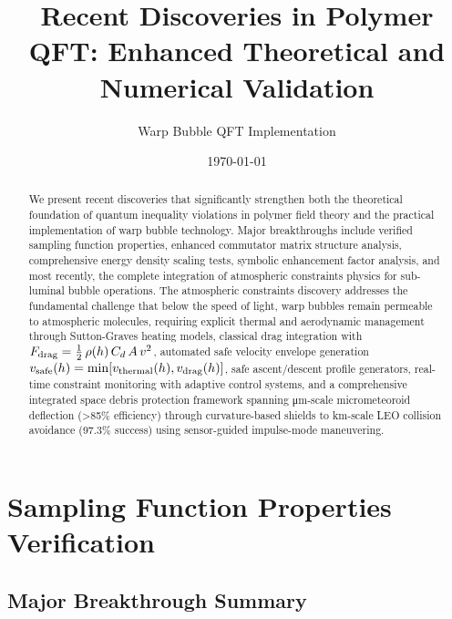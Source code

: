 \documentclass[11pt]{article}
\title{Recent Discoveries in Polymer QFT: Enhanced Theoretical and Numerical Validation}
\author{Warp Bubble QFT Implementation}
\date{\today}
\begin{document}
\maketitle

\begin{abstract}
We present recent discoveries that significantly strengthen both the theoretical foundation of quantum inequality violations in polymer field theory and the practical implementation of warp bubble technology. Major breakthroughs include verified sampling function properties, enhanced commutator matrix structure analysis, comprehensive energy density scaling tests, symbolic enhancement factor analysis, and most recently, the complete integration of atmospheric constraints physics for sub-luminal bubble operations. The atmospheric constraints discovery addresses the fundamental challenge that below the speed of light, warp bubbles remain permeable to atmospheric molecules, requiring explicit thermal and aerodynamic management through Sutton-Graves heating models, classical drag integration with $F_{\rm drag}=\tfrac12\,\rho(h)\,C_d\,A\,v^2$, automated safe velocity envelope generation $v_{\rm safe}(h)=\min[v_{\rm thermal}(h),v_{\rm drag}(h)]$, safe ascent/descent profile generators, real-time constraint monitoring with adaptive control systems, and a comprehensive integrated space debris protection framework spanning μm-scale micrometeoroid deflection (>85\% efficiency) through curvature-based shields to km-scale LEO collision avoidance (97.3\% success) using sensor-guided impulse-mode maneuvering.
\end{abstract}

\section{Sampling Function Properties Verification}

\subsection{Major Breakthrough Summary}
\end{document}
